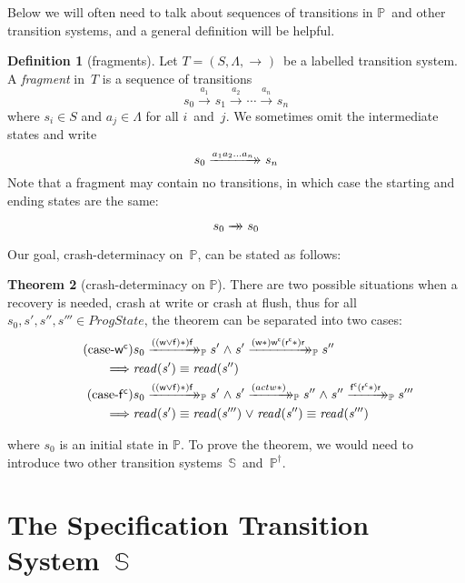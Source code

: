 \documentclass[letterpaper,twocolumn,10pt]{article}
\theoremstyle{definition}
\newtheorem{theorem}{Theorem}[section]
\newtheorem{definition}[theorem]{Definition}
\newcommand{\conj}{\mathrel\land}
\newcommand{\disj}{\mathrel\lor}
\renewcommand{\i}[1]{\ensuremath{\mathit{#1}}}
\newcommand{\Spec}{\ensuremath{\mathbb S}}
\newcommand{\Prog}{\ensuremath{\mathbb P}}
\newcommand{\ProgInv}{\ensuremath{\mathbb P^\dagger}}
\newcommand{\actw}{\mathsf w}
\newcommand{\actwc}{\mathsf w^\mathsf{c}}
\newcommand{\actf}{\mathsf f}
\newcommand{\actr}{\mathsf r}
\newcommand{\actfc}{\mathsf{f^c}}
\newcommand{\actrc}{\mathsf{r^c}}
\newcommand{\ttIn}[2]{\xrightarrow{#1}_{#2}}
\newcommand{\dxrightarrow}[1]{\xrightarrow{#1}\mathrel{\mkern-14mu}\rightarrow}
\newcommand{\ttsIn}[2]{\dxrightarrow{#1}_{#2}}
\newcommand{\ttsP}[1]{\ttsIn{#1}{\Prog}}
\begin{document}
Below we will often need to talk about sequences of transitions in \Prog\ and other transition systems, and a general definition will be helpful.
\begin{definition}[fragments]
Let $T = (S, \Lambda, \ttIn{}{})$~be a labelled transition system.
A \emph{fragment} in~$T$ is a sequence of transitions
$$ s_0 \ttIn{a_1}{} s_1 \ttIn{a_2}{} \cdots \ttIn{a_n}{} s_n $$
where $s_i \in S$ and $a_j \in \Lambda$ for all $i$~and~$j$.
We sometimes omit the intermediate states and write
$$ s_0 \ttsIn{a_1a_2\ldots a_n}{} s_n $$
Note that a fragment may contain no transitions, in which case the starting and ending states are the same: 
$$ s_0 \ttsIn{\vphantom{a_n}}{} s_0 $$
\end{definition}
Our goal, crash-determinacy on~\Prog, can be stated as follows:
\begin{theorem}[crash-determinacy on \Prog] \label{theoremP}
	There are two possible situations when a recovery is needed, crash at write or crash at flush, thus for all $s_0, s', s'', s''' \in \i{ProgState}$, the theorem can be separated into two cases:
\begin{align*}
\tag{case-\i{\actwc}}
	&s_0 \ttsP{\i{((\actw \lor \actf)\ast)} \actf} s' \conj s' \ttsP{\i{(\actw\ast)} \actwc \i{(\actrc\ast)} \actr} s'' \\
	\implies &\i{read(s')} \equiv \i{read(s'')}
\\
\tag{case-\i{\actfc}}
		&s_0 \ttsP{\i{((\actw \lor \actf)\ast)} \actf} s' \conj s' \ttsP{\i(actw\ast)} s'' \conj s'' \ttsP{\actfc \i{(\actrc\ast)} \actr} s''' \\
	\implies &\i{read(s')} \equiv \i{read(s''')} \disj \i{read(s'')} \equiv \i{read(s''')}
\end{align*}
\end{theorem}
where $s_0$ is an initial state in \Prog.
To prove the theorem, we would need to introduce two other transition systems~\Spec~and~\ProgInv.


\section{The Specification Transition System~\Spec}
\label{sec:Spec}
\end{document}
